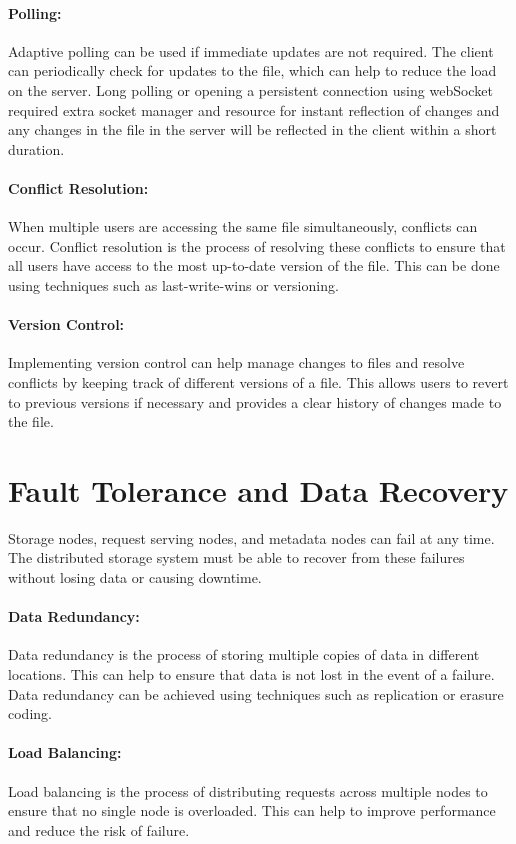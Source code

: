 \paragraph{Polling:} Adaptive polling can be used if immediate updates are not required. The client can periodically check for updates to the file, which can help to reduce the load on the server. Long polling or opening a persistent connection using webSocket required extra socket manager and resource for instant reflection of changes and any changes in the file in the server will be reflected in the client within a short duration.

\paragraph{Conflict Resolution:} When multiple users are accessing the same file simultaneously, conflicts can occur. Conflict resolution is the process of resolving these conflicts to ensure that all users have access to the most up-to-date version of the file. This can be done using techniques such as last-write-wins or versioning.

\paragraph{Version Control:} Implementing version control can help manage changes to files and resolve conflicts by keeping track of different versions of a file. This allows users to revert to previous versions if necessary and provides a clear history of changes made to the file.

\section{Fault Tolerance and Data Recovery}
Storage nodes, request serving nodes, and metadata nodes can fail at any time. The distributed storage system must be able to recover from these failures without losing data or causing downtime.

\paragraph{Data Redundancy:} Data redundancy is the process of storing multiple copies of data in different locations. This can help to ensure that data is not lost in the event of a failure. Data redundancy can be achieved using techniques such as replication or erasure coding.

\paragraph{Load Balancing:} Load balancing is the process of distributing requests across multiple nodes to ensure that no single node is overloaded. This can help to improve performance and reduce the risk of failure.

